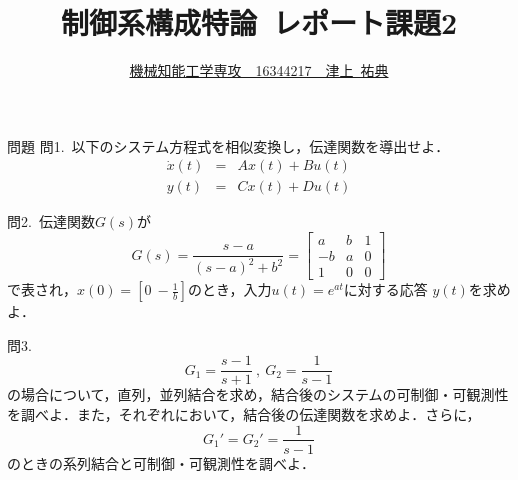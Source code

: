 \documentclass[a4paper,12pt]{jarticle}
\begin{document}
%
\title{\vspace{-30mm} 制御系構成特論~レポート課題2}
\author{\underline{機械知能工学専攻~~16344217~~津上~祐典}}
\date{}
%
\maketitle
%
\vspace{-25mm}
%

\begin{itembox}[l]{\Large{問題}}
問1.~以下のシステム方程式を相似変換し，伝達関数を導出せよ．
  \begin{eqnarray}
   \dot{x}(t)&=&Ax(t)+Bu(t) \\
   y(t)&=&Cx(t)+Du(t)
  \end{eqnarray}

問2.~伝達関数$G(s)$が
\begin{equation}
 G(s)=\frac{s-a}{(s-a)^2+b^2}
  =\left[
  \begin{array}{rc|r}
  a  & b & 1 \\
   -b & a & 0 \\ \hline
   1  & 0 & 0
  \end{array}
  \right]
\end{equation}
で表され，$x(0)=[0~-\frac{1}{b}]$のとき，入力$u(t)=e^{at}$に対する応答
$y(t)$を求めよ．
 
問3.
 \begin{equation}
 G_1=\frac{s-1}{s+1}~,~G_2=\frac{1}{s-1}
 \end{equation}
 の場合について，直列，並列結合を求め，結合後のシステムの可制御・可観測性
 を調べよ．また，それぞれにおいて，結合後の伝達関数を求めよ．さらに，
 \begin{equation}
  G_1'=G_2'=\frac{1}{s-1}  
 \end{equation}
 のときの系列結合と可制御・可観測性を調べよ．
\end{itembox}

\vspace{-10mm}
\end{document}
